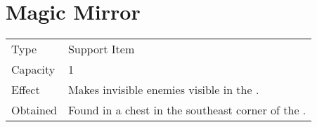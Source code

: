 \section{Magic Mirror}
\label{item:magic_mirror}


\noindent\begin{tabularx}{\textwidth}[l]{lX}
	Type
	& Support Item
\\
	Capacity
	& 1
\\
	Effect
	& Makes invisible enemies visible in the \nameref{map:ice_pyramid}.
\\
	Obtained
	& Found in a chest in the southeast corner of the \nameref{map:ice_pyramid}.
\end{tabularx}
